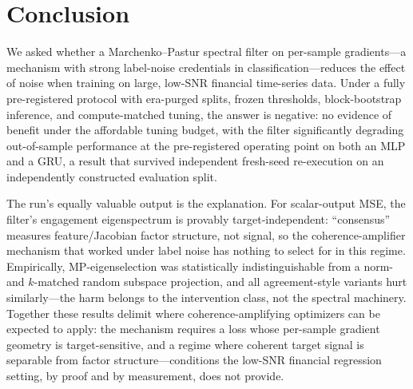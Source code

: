 \section{Conclusion}
\label{sec:conclusion}

We asked whether a Marchenko--Pastur spectral filter on per-sample
gradients---a mechanism with strong label-noise credentials in
classification---reduces the effect of noise when training on large,
low-SNR financial time-series data. Under a fully pre-registered protocol
with era-purged splits, frozen thresholds, block-bootstrap inference, and
compute-matched tuning, the answer is negative: no evidence of benefit
under the affordable tuning budget, with the filter significantly degrading
out-of-sample performance at the pre-registered operating point on both an
MLP and a GRU, a result that survived independent fresh-seed re-execution
on an independently constructed evaluation split.

The run's equally valuable output is the explanation. For scalar-output
MSE, the filter's engagement eigenspectrum is provably target-independent:
``consensus'' measures feature/Jacobian factor structure, not signal, so
the coherence-amplifier mechanism that worked under label noise has nothing
to select for in this regime. Empirically, MP-eigenselection was
statistically indistinguishable from a norm- and $k$-matched random
subspace projection, and all agreement-style variants hurt similarly---the
harm belongs to the intervention class, not the spectral machinery. Together
these results delimit where coherence-amplifying optimizers can be expected
to apply: the mechanism requires a loss whose per-sample gradient geometry
is target-sensitive, and a regime where coherent target signal is separable
from factor structure---conditions the low-SNR financial regression setting,
by proof and by measurement, does not provide.

